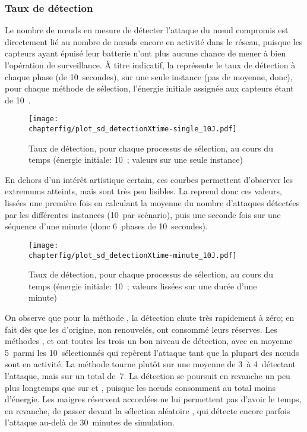         \subsubsection{Taux de détection}
Le nombre de nœuds en mesure de détecter l'attaque du nœud compromis est directement lié au nombre de nœuds encore en activité dans le réseau, puisque les capteurs ayant épuisé leur batterie n'ont plus aucune chance de mener à bien l'opération de surveillance.
À titre indicatif, la  représente le taux de détection à chaque phase (de 10~secondes), sur une seule instance (pas de moyenne, donc), pour chaque méthode de sélection, l'énergie initiale assignée aux capteurs étant de 10~\joule.
\begin{figure}[p]
    \centering
    \texttt{[image: \\chapterfig/plot\_sd\_detectionXtime-single\_10J.pdf]}
    \caption[Taux de détection au cours du temps (énergie initiale: 10~\joule; valeurs sur une seule instance)]{Taux de détection, pour chaque processus de sélection, au cours du temps (énergie initiale: 10~\joule; valeurs sur une seule instance)}\label{sd:fig:detec-one-10J}
\end{figure}
En dehors d'un intérêt artistique certain, ces courbes permettent d'observer les extremums atteints, mais sont très peu lisibles.
La  reprend donc ces valeurs, lissées une première fois en calculant la moyenne du nombre d'attaques détectées par les différentes instances (10~par scénario), puis une seconde fois sur une séquence d'une minute (donc 6~phases de 10~secondes).
\begin{figure}[p]
    \centering
    \texttt{[image: \\chapterfig/plot\_sd\_detectionXtime-minute\_10J.pdf]}
    \caption[Taux de détection au cours du temps (énergie initiale: 10~\joule)]{Taux de détection, pour chaque processus de sélection, au cours du temps (énergie initiale: 10~\joule; valeurs lissées sur une durée d'une minute)}\label{sd:fig:detec-min-10J}
\end{figure}
On observe que pour la méthode \idstat, la détection chute très rapidement à zéro; en fait dès que les \cns d'origine, non renouvelés, ont consommé leurs réserves.
Les méthodes \idrand, \ideres et \iddemx ont toutes les trois un bon niveau de détection, avec en moyenne 5~\cns parmi les 10~sélectionnés qui repèrent l'attaque tant que la plupart des nœuds sont en activité.
La méthode \iddems tourne plutôt sur une moyenne de 3~à 4~\cns détectant l'attaque, mais sur un total de~7.
La détection se poursuit en revanche un peu plus longtemps que sur \ideres et \iddemx, puisque les nœuds consomment au total moins d'énergie.
Les maigres réservent accordées ne lui permettent pas d'avoir le temps, en revanche, de passer devant la sélection aléatoire \idrand, qui détecte encore parfois l'attaque au-delà de 30~minutes de simulation.

